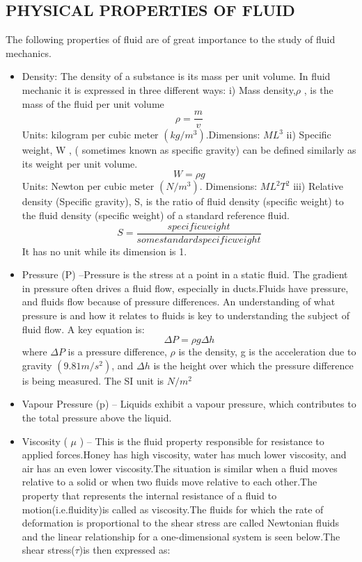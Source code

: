 \documentclass[a4paper,12pt]{report}
\begin{document}
{\subsection{PHYSICAL PROPERTIES OF FLUID} 
The following properties of fluid are of great importance to the study of fluid mechanics.
\begin{itemize}
\item Density: The density of a substance is its mass per unit volume. In fluid mechanic it is expressed in three different ways:
\subitem i) Mass density,$\rho$ , is the mass of the fluid per unit volume
                        $$\rho = \frac{m}{v}$$
Units: kilogram per cubic meter $(kg/m^{3})$.Dimensions: $ML^{3}$
\subitem ii) Specific weight, W , ( sometimes known as specific gravity) can be defined similarly as its weight per unit volume. 
$$W = \rho g$$
Units: Newton per cubic meter $(N/m^3)$. Dimensions: $ML^2T^2$
\subitem iii) Relative density (Specific gravity), S, is the ratio of fluid density (specific weight) to the fluid density (specific weight) of a standard reference fluid.
$$S = \frac{specific weight}{some standard specificweight}$$
It has no unit while its dimension is 1.
\item Pressure (P) –Pressure is the stress at a point in a static fluid. The gradient in pressure often drives a fluid flow, especially in ducts.Fluids have pressure, and fluids flow because of pressure differences. An understanding of what pressure is and how it relates to fluids is key to understanding the subject of fluid flow. A key equation is:
$$\Delta P = \rho g\Delta h$$
where $\Delta P$ is a pressure difference, $\rho$ is the density, g is the acceleration due to gravity $(9.81 m/s^2)$, and $\Delta h$ is the height over which the pressure difference is being measured. The SI unit is $N/m^2$
\item Vapour Pressure (p) – Liquids exhibit a vapour pressure, which contributes to the total pressure above the liquid.
\item Viscosity ( $\mu$ ) – This is the fluid property responsible for resistance to applied forces.Honey has high viscosity, water has much lower viscosity, and air has an even lower viscosity.The situation is similar when a fluid moves relative to a solid or when two fluids move relative to each other.The property that represents the internal resistance of a fluid to motion(i.e.fluidity)is called as viscosity.The fluids for which the rate of deformation is proportional to the shear stress are called Newtonian fluids and the linear relationship for a one-dimensional system is seen below.The shear stress($\tau$)is then expressed as:

\end{itemize}}
\end{document}
